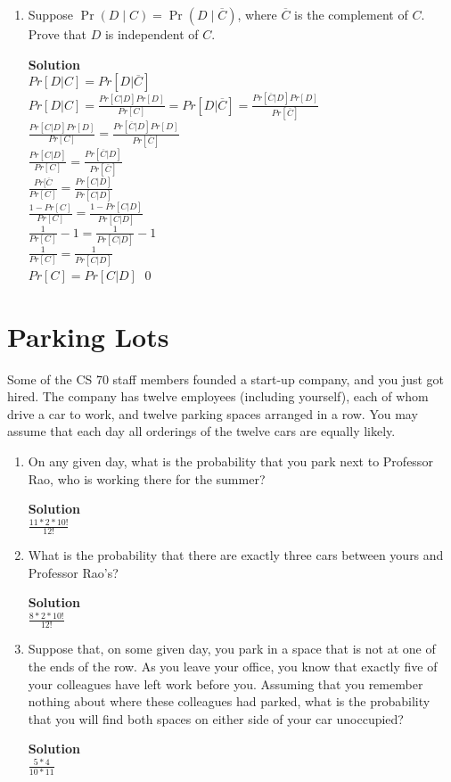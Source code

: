 \documentclass[11pt]{article}
\newcommand*{\Question}[1]{\section{#1}}
\newenvironment{Parts}{\begin{enumerate}[label=(\alph*)]}{\end{enumerate}}
\newcommand*{\Part}{\item}
\begin{document}
\begin{Parts}
\Part Suppose $\Pr(D \mid C) = \Pr(D \mid \overline{C})$, where $\overline{C}$ is the complement of $C$. Prove that $D$ is independent of $C$.
\begin{mdframed} \textbf{Solution} \\
$Pr[D|C]=Pr[D|\overline{C}]$ \\
$Pr[D|C]=\frac{Pr[C|D]Pr[D]}{Pr[C]}=Pr[D|\overline{C}]=\frac{Pr[\overline{C}|D]Pr[D]}{Pr[\overline{C}]}$ \\
$\frac{Pr[C|D]Pr[D]}{Pr[C]}=\frac{Pr[\overline{C}|D]Pr[D]}{Pr[\overline{C}]}$ \\
$\frac{Pr[C|D]}{Pr[C]}=\frac{Pr[\overline{C}|D]}{Pr[\overline{C}]}$ \\
$\frac{Pr[\overline{C}}{Pr[C]}=\frac{Pr[C|D]}{Pr[C|D]}$ \\
$\frac{1-Pr[C]}{Pr[C]}=\frac{1-Pr[C|D]}{Pr[C|D]}$ \\
$\frac{1}{Pr[C]}-1=\frac{1}{Pr[C|D]}-1$ \\
$\frac{1}{Pr[C]}=\frac{1}{Pr[C|D]}$ \\
$Pr[C]=Pr[C|D]$ \qed
\end{mdframed}

\end{Parts}

\Question{Parking Lots}

Some of the CS 70 staff members founded a start-up company, and you just got hired.
The company has twelve employees (including yourself), each of whom drive a car to work, 
and twelve parking spaces arranged in a row. You may assume that each day all orderings 
of the twelve cars are equally likely.

\begin{Parts}

\Part On any given day, what is the probability that you park next to Professor Rao, 
who is working there for the summer?
\begin{mdframed} \textbf{Solution} \\
$\frac{11*2*10!}{12!}$ 
\end{mdframed}

\Part What is the probability that there are exactly three cars between yours
and Professor Rao's?
\begin{mdframed} \textbf{Solution} \\
$\frac{8*2*10!}{12!}$ 
\end{mdframed}

\Part Suppose that, on some given day, you park in a space that is not at one of
the ends of the row.  As you leave your office, you know that exactly five of
your colleagues have left work before you.  Assuming that you remember nothing
about where these colleagues had parked, what is the probability that you will
find both spaces on either side of your car unoccupied?
\begin{mdframed} \textbf{Solution} \\
$\frac{5*4}{10*11}$
\end{mdframed}
\end{Parts}
\end{document}
